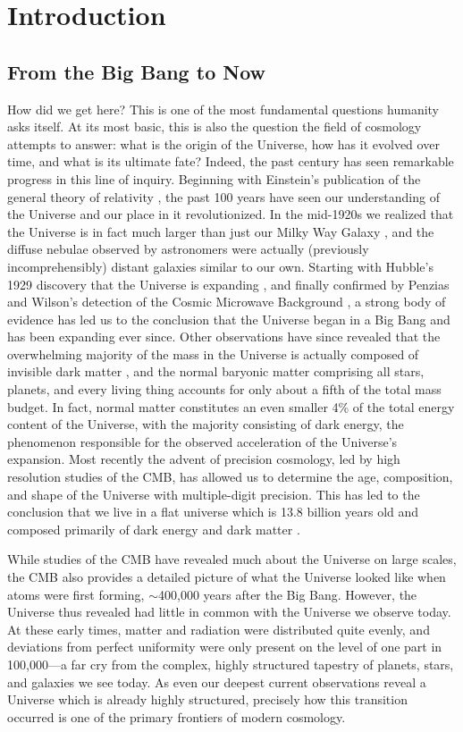 \documentclass[../thesis.tex]{subfiles}
\begin{document}
\chapter{Introduction}
\section{From the Big Bang to Now}
How did we get here?  
This is one of the most fundamental questions humanity asks itself.  
At its most basic, this is also the question the field of cosmology attempts to answer: what is the origin of the Universe, how has it evolved over time, and what is its ultimate fate? 
Indeed, the past century has seen remarkable progress in this line of inquiry.
Beginning with Einstein's publication of the general theory of relativity \citep{Einstein1915}, the past 100 years have seen our understanding of the Universe and our place in it revolutionized. 
In the mid-1920s we realized that the Universe is in fact much larger than just our Milky Way Galaxy \citep{Hubble1925}, and the diffuse nebulae observed by astronomers were actually (previously incomprehensibly) distant galaxies similar to our own.
Starting with Hubble's 1929 discovery that the Universe is expanding \citep{Hubble1929}, and finally confirmed by Penzias and Wilson's detection of the Cosmic Microwave Background \citep[CMB;][]{PenziasWilson1965, Dickeetal1965}, a strong body of evidence has led us to the conclusion that the Universe began in a Big Bang and has been expanding ever since.
Other observations have since revealed that the overwhelming majority of the mass in the Universe is actually composed of invisible dark matter \citep{Rubin}, and the normal baryonic matter comprising all stars, planets, and every living thing accounts for only about a fifth of the total mass budget. 
In fact, normal matter constitutes an even smaller 4\% of the total energy content of the Universe, with the majority consisting of dark energy, the phenomenon responsible for the observed acceleration of the Universe's expansion\citep{universeacceleration}.
Most recently the advent of precision cosmology, led by high resolution studies of the CMB, has allowed us to determine the age, composition, and shape of the Universe with multiple-digit precision.  
This has led to the conclusion that we live in a flat universe which is 13.8 billion years old and composed primarily of dark energy and dark matter \citep{PlanckParams2015}.

While studies of the CMB have revealed much about the Universe on large scales, the CMB also provides a detailed picture of what the Universe looked like when atoms were first forming, $\sim$400,000 years after the Big Bang. 
However, the Universe thus revealed had little in common with the Universe we observe today.  
At these early times, matter and radiation were distributed quite evenly, and deviations from perfect uniformity were only present on the level of one part in 100,000---a far cry from the complex, highly structured tapestry of planets, stars, and galaxies we see today.
As even our deepest current observations reveal a Universe which is already highly structured, precisely how this transition occurred is one of the primary frontiers of modern cosmology.
\end{document}
